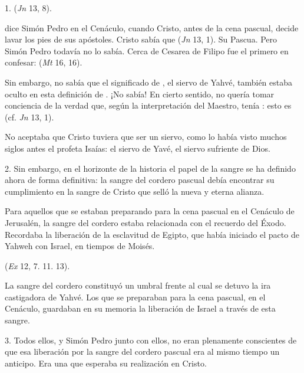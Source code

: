 \begin{body}
1.  (\textit{Jn} 13, 8). 

 dice Simón Pedro en el Cenáculo, cuando Cristo, antes de la cena pascual, decide lavar los pies de sus apóstoles. Cristo sabía que  (\textit{Jn} 13, 1). Su Pascua. Pero Simón Pedro todavía no lo sabía. Cerca de Cesarea de Filipo fue el primero en confesar:  (\textit{Mt} 16, 16). 

Sin embargo, no sabía que el significado de , el siervo de Yahvé, también estaba oculto en esta definición de . ¡No sabía! En cierto sentido, no quería tomar conciencia de la verdad que, según la interpretación del Maestro, tenía : esto es  (cf. \textit{Jn} 13, 1). 

No aceptaba que Cristo tuviera que ser un siervo, como lo había visto muchos siglos antes el profeta Isaías: el siervo de Yavé, el siervo sufriente de Dios. 

2. Sin embargo, en el horizonte de la historia el papel de la sangre se ha definido ahora de forma definitiva: la sangre del cordero pascual debía encontrar su cumplimiento en la sangre de Cristo que selló la nueva y eterna alianza. 

Para aquellos que se estaban preparando para la cena pascual en el Cenáculo de Jerusalén, la sangre del cordero estaba relacionada con el recuerdo del Éxodo. Recordaba la liberación de la esclavitud de Egipto, que había iniciado el pacto de Yahweh con Israel, en tiempos de Moisés. 

 (\textit{Ex} 12, 7. 11. 13). 

La sangre del cordero constituyó un umbral frente al cual se detuvo la ira castigadora de Yahvé. Los que se preparaban para la cena pascual, en el Cenáculo, guardaban en su memoria la liberación de Israel a través de esta sangre. 

3. Todos ellos, y Simón Pedro junto con ellos, no eran plenamente conscientes de que esa liberación por la sangre del cordero pascual era al mismo tiempo un anticipo. Era una  que esperaba su realización en Cristo. 


\end{body}
